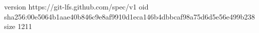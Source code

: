 version https://git-lfs.github.com/spec/v1
oid sha256:00e5064b1aae40b846c9e8af9910d1eca146b4dbbcaf98a75d6d5e56e499b238
size 1211
